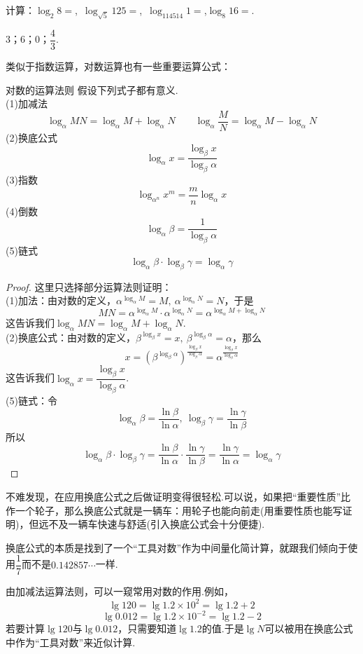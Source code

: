 \documentclass[lang=cn, zihao=5]{elegantbook}
\newcommand{\tk}{\uline{\hspace{4em}}}
\begin{document}
\begin{example}
	计算：$\log_{2}{8}=$\tk ,~$\log_{\sqrt{5}}{125}=$\tk ,~$\log_{114514}{1}=$\tk ,$\log_{8}{16}=$\tk .
\end{example}
\begin{solution}
	$3$；$6$；$0$；$\dfrac{4}{3}$.
\end{solution}

类似于指数运算，对数运算也有一些重要运算公式：

\begin{proposition}{对数的运算法则}
	假设下列式子都有意义. \\
	(1)加减法$$\log_{\alpha}{MN} = \log_{\alpha}{M} + \log_{\alpha}{N} \qquad \log_{\alpha}{\frac{M}{N}} = \log_{\alpha}{M} - \log_{\alpha}{N}$$
	(2)换底公式$$\log_{\alpha}{x} = \frac{\log_{\beta}{x}}{\log_{\beta}{\alpha}}$$
	(3)指数$$\log_{\alpha ^n}{x^m} = \frac{m}{n} \log_{\alpha}{x}$$
	(4)倒数$$\log_{\alpha}{\beta} = \frac{1}{\log_{\beta}{\alpha}}$$
	(5)链式$$\log_{\alpha}{\beta} \cdot \log_{\beta}{\gamma} = \log_{\alpha}{\gamma}$$
\end{proposition}
\begin{proof}
	这里只选择部分运算法则证明： \\
	(1)加法：由对数的定义，$\alpha ^{\log_{\alpha}{M}} = M,~\alpha ^{\log_{\alpha}{N}} = N$，于是$$MN = \alpha ^{\log_{\alpha}{M}} \cdot \alpha ^{\log_{\alpha}{N}} = \alpha ^{\log_{\alpha}{M} + \log_{\alpha}{N}}$$
	这告诉我们$\log_{\alpha}{MN} = \log_{\alpha}{M} + \log_{\alpha}{N}$. \\
	(2)换底公式：由对数的定义，$\beta ^{\log_{\beta}{x}} = x,~\beta ^{\log_{\beta}{\alpha}} = \alpha$，那么$$x = (\beta ^{\log_{\beta}{\alpha}})^{\frac{\log_{\beta}{x}}{\log_{\beta}{\alpha}}} = \alpha ^{\frac{\log_{\beta}{x}}{\log_{\beta}{\alpha}}}$$
	这告诉我们$\log_{\alpha}{x} = \dfrac{\log_{\beta}{x}}{\log_{\beta}{\alpha}}$. \\
	(5)链式：令$$\log_{\alpha}{\beta} = \frac{\ln{\beta}}{\ln{\alpha}},~ \log_{\beta}{\gamma} = \frac{\ln{\gamma}}{\ln{\beta}}$$
	所以$$\log_{\alpha}{\beta} \cdot \log_{\beta}{\gamma} = \frac{\ln{\beta}}{\ln{\alpha}} \cdot \frac{\ln{\gamma}}{\ln{\beta}} = \frac{\ln{\gamma}}{\ln{\alpha}} = \log_{\alpha}{\gamma}$$
\end{proof}
\begin{remark}
	不难发现，在应用换底公式之后做证明变得很轻松.可以说，如果把“重要性质”比作一个轮子，那么换底公式就是一辆车：用轮子也能向前走(用重要性质也能写证明)，但远不及一辆车快速与舒适(引入换底公式会十分便捷).
\end{remark}
\begin{remark}
	换底公式的本质是找到了一个“工具对数”作为中间量化简计算，就跟我们倾向于使用$\dfrac{1}{7}$而不是$0.142857\cdots$一样.
\end{remark}
\begin{remark}
	由加减法运算法则，可以一窥常用对数的作用.例如，
	$$\lg{120} = \lg{1.2 \times 10^2} = \lg{1.2}+2$$
	$$\lg{0.012} = \lg{1.2 \times 10^{-2}} = \lg{1.2}-2$$
	若要计算$\lg{120}$与$\lg{0.012}$，只需要知道$\lg{1.2}$的值.于是$\lg{N}$可以被用在换底公式中作为“工具对数”来近似计算.
\end{remark}
\end{document}
